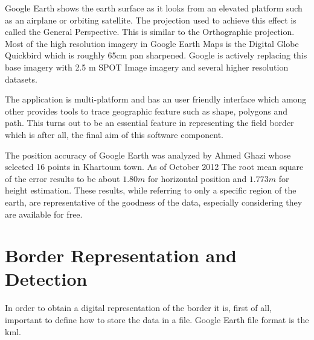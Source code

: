 Google Earth shows the earth surface as it looks from an elevated platform such as an airplane or orbiting satellite. The projection used to achieve this effect is called the General Perspective. This is similar to the Orthographic projection. Most of the high resolution imagery in Google Earth Maps is the Digital Globe Quickbird which is roughly 65cm pan sharpened. Google is actively replacing this base imagery with 2.5 m SPOT Image imagery and several higher resolution datasets.\par
The application is multi-platform and has an user friendly interface which among other provides tools to trace geographic feature such as shape, polygons and path. This turns out to be an essential feature in representing the field border which is after all, the final aim of this software component.\par
The position accuracy of Google Earth was analyzed by Ahmed Ghazi whose selected 16 points in Khartoum
town. As of October 2012 The root mean square of the error results to be about $1.80m$ for horizontal position and $1.773m$ for height estimation.\cite{PosAccuracyGE} These results, while referring to only a specific region of the earth, are representative of the goodness of the data, especially considering they are available for free.\\
\pagebreak
\section{Border Representation and Detection} %
\label{sec:border_detection_and_representation}
In order to obtain a digital representation of the border it is, first of all, important to define how to store the data in a file. Google Earth file format is the \acrfull{kml}.

